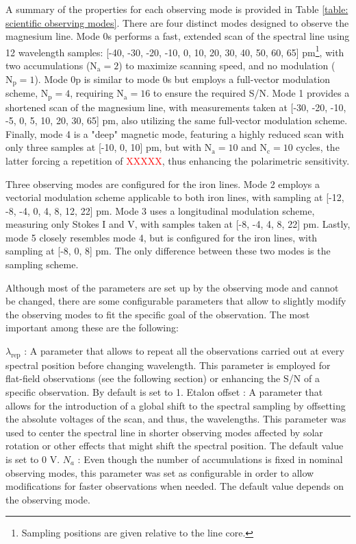 A summary of the properties for each observing mode is provided in Table \ref{table: scientific observing modes}. There are four distinct modes designed to observe the magnesium line. Mode 0s performs a fast, extended scan of the spectral line using 12 wavelength samples: [-40, -30, -20, -10, 0, 10, 20, 30, 40, 50, 60, 65] pm\footnote{Sampling positions are given relative to the line core.}, with two accumulations ($\text{N}_{\text{a}} = 2$) to maximize scanning speed, and no modulation ($\text{N}_{\text{p}} = 1$). Mode 0p is similar to mode 0s but employs a full-vector modulation scheme, $\text{N}_{\text{p}} = 4$, requiring $\text{N}_{\text{a}} = 16$ to ensure the required S/N. Mode 1 provides a shortened scan of the magnesium line, with measurements taken at [-30, -20, -10, -5, 0, 5, 10, 20, 30, 65] pm, also utilizing the same full-vector modulation scheme. Finally, mode 4 is a "deep" magnetic mode, featuring a highly reduced scan with only three samples at [-10, 0, 10] pm, but with $\text{N}_{\text{a}} = 10$ and $\text{N}_{\text{c}} = 10$ cycles, the latter forcing a repetition of \textcolor{red}{XXXXX}, thus enhancing the polarimetric sensitivity.

Three observing modes are configured for the iron lines. Mode 2 employs a vectorial modulation scheme applicable to both iron lines, with sampling at [-12, -8, -4, 0, 4, 8, 12, 22] pm. Mode 3 uses a longitudinal modulation scheme, measuring only Stokes I and V, with samples taken at [-8, -4, 4, 8, 22] pm. Lastly, mode 5 closely resembles mode 4, but is configured for the iron lines, with sampling at [-8, 0, 8] pm. The only difference between these two modes is the sampling scheme.

Although most of the parameters are set up by the observing mode and cannot be changed, there are some configurable parameters that allow to slightly modify the observing modes to fit the specific goal of the observation. The most important among these are the following:

\begin{itemize}
    \Myitem $\lambda _ {\text{rep}}$ : A parameter that allows to repeat all the observations carried out at every spectral position before changing wavelength. This parameter is employed for flat-field observations (see the following section) or enhancing the S/N of a specific observation. By default is set to 1.
    \Myitem Etalon offset : A parameter that allows for the introduction of a global shift to the spectral sampling by offsetting the absolute voltages of the scan, and thus, the wavelengths. This parameter was used to center the spectral line in shorter observing modes affected by solar rotation or other effects that might shift the spectral position. The default value is set to 0 V.
    \Myitem $N_a$ : Even though the number of accumulations is fixed in nominal observing modes, this parameter was set as configurable in order to allow modifications for faster observations when needed. The  default value depends on the observing mode.  
\end{itemize}



